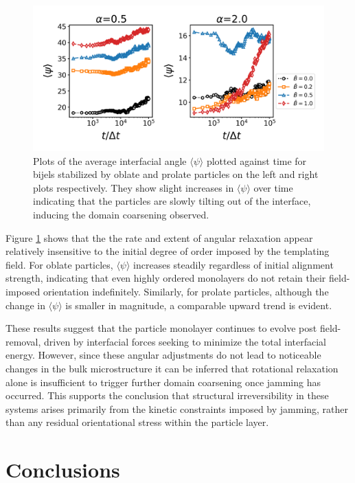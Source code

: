 \begin{figure} 
\centering 
\includegraphics[scale=0.6]{../figures/results/paper2/psi-field_down.png} 
\caption{Plots of the average interfacial angle $\langle \psi \rangle$  plotted against time for bijels stabilized by oblate and prolate particles
         on the left and right plots respectively. They show slight increases in $\langle \psi \rangle$ over time indicating that the particles are
         slowly tilting out of the interface, inducing the domain coarsening observed.} 
\label{fig:interface_angle-field_down} 
\end{figure}

Figure \ref{fig:interface_angle-field_down} shows that the the rate and extent of angular relaxation appear relatively insensitive to the initial degree of 
order imposed by the templating field. For oblate particles, \(\langle \psi \rangle\) increases steadily regardless of initial alignment strength, indicating that 
even highly ordered monolayers do not retain their field-imposed orientation indefinitely. Similarly, for prolate particles, although the change in 
\(\langle \psi \rangle\) is smaller in magnitude, a comparable upward trend is evident.

These results suggest that the particle monolayer continues to evolve post field-removal, driven by interfacial forces seeking to minimize the total interfacial 
energy. However, since these angular adjustments do not lead to noticeable changes in the bulk microstructure it can be 
inferred that rotational relaxation alone is insufficient to trigger further domain coarsening once jamming has occurred. This supports the conclusion that 
structural irreversibility in these systems arises primarily from the kinetic constraints imposed by jamming, rather than any residual orientational stress 
within the particle layer.

\section{Conclusions}

